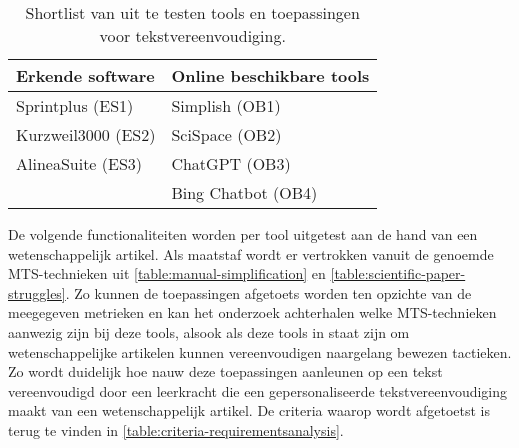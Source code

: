 \begin{center}
	\begin{table}[H]
		\begin{tabular}{ | m{6cm} | m{6cm} | } 
			\hline
			\textbf{Erkende software} & Online beschikbare tools \\
			\hline
			Sprintplus (ES1) & Simplish (OB1) \\
			Kurzweil3000 (ES2) & SciSpace (OB2) \\ 
			AlineaSuite	(ES3) & ChatGPT (OB3) \\
			& Bing Chatbot (OB4)\\
			\hline
		\end{tabular}
	\label{table:shortlist-tools}	
	\caption{Shortlist van uit te testen tools en toepassingen voor tekstvereenvoudiging.}
	\end{table}
\end{center}


De volgende functionaliteiten worden per tool uitgetest aan de hand van een wetenschappelijk artikel. Als maatstaf wordt er vertrokken vanuit de genoemde MTS-technieken uit \ref{table:manual-simplification} en \ref{table:scientific-paper-struggles}. Zo kunnen de toepassingen afgetoets worden ten opzichte van de meegegeven metrieken en kan het onderzoek achterhalen welke MTS-technieken aanwezig zijn bij deze tools, alsook als deze tools in staat zijn om wetenschappelijke artikelen kunnen vereenvoudigen naargelang bewezen tactieken. Zo wordt duidelijk hoe nauw deze toepassingen aanleunen op een tekst vereenvoudigd door een leerkracht die een gepersonaliseerde tekstvereenvoudiging maakt van een wetenschappelijk artikel. De criteria waarop wordt afgetoetst is terug te vinden in \ref{table:criteria-requirementsanalysis}.

